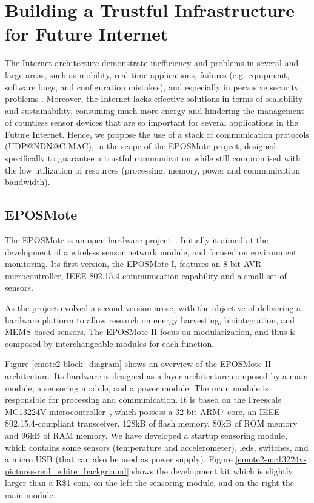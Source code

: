 \section{Building a Trustful Infrastructure for Future Internet}
\label{sec:solution}
The Internet architecture demonstrate inefficiency and problems in several and large areas, such as mobility, real-time applications,
failures (e.g. equipment, software bugs, and configuration mistakes), and especially in pervasive security problems \cite{Rexford:2010}.
Moreover, the Internet lacks effective solutions in terms of scalability and sustainability, 
consuming much more energy and hindering the management of countless sensor devices that are so important for several applications in the Future Internet.
Hence, we propose the use of a stack of communication protocols (UDP@NDN@C-MAC), in the scope of the EPOSMote project,
designed specifically to guarantee a trustful communication
while still compromised with the low utilization of resources (processing, memory, power and communication bandwidth).

\subsection{EPOSMote}
The EPOSMote is an open hardware project~\cite{eposmote}. Initially it aimed at 
the development of a wireless sensor network module, and focused on environment 
monitoring. Its first version, the EPOSMote I, features an 8-bit AVR microcontroller, 
IEEE 802.15.4 communication capability and a small set of sensors.

As the project evolved a second version arose, with the objective of delivering a 
hardware platform to allow research on energy harvesting, biointegration, and 
MEMS-based sensors. The EPOSMote II focus on modularization, and thus is composed 
by interchangeable modules for each function.

Figure \ref{emote2-block_diagram} shows an overview of the EPOSMote II architecture.
Its hardware is designed as a layer architecture composed by a main module,
a sensoring module, and a power module. The main module is responsible for processing
and communication. It is based on the Freescale MC13224V microcontroller~\cite{mc13224v}, which possess 
a 32-bit ARM7 core, an IEEE 802.15.4-compliant transceiver, 128kB of flash memory, 80kB of ROM memory
and 96kB of RAM memory. We have developed a startup sensoring module, which contains some sensors  
(temperature and accelerometer), leds, switches, and a micro USB (that can also be used as power supply). 
Figure \ref{emote2-mc13224v-pictures-real_white_background} shows the development kit which is slightly 
larger than a R\$1 coin, on the left the sensoring module, and on the right the main module.

